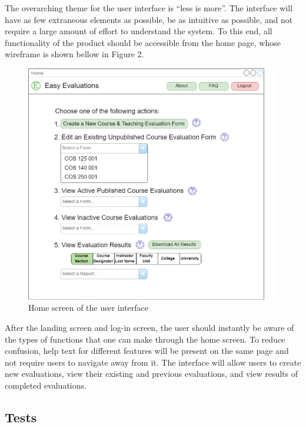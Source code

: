\documentclass{article}
\begin{document}
The overarching theme for the user interface is ``less is more''.  The interface will have as few extraneous elements as possible, be as intuitive as possible, and not require a large amount of effort to understand the system.  To this end, all functionality of the product should be accessible from the home page, whose wireframe is shown bellow in Figure 2. 

\begin{center}
\begin{figure}[H]
    \centering
    \includegraphics[width=5.5in]{images/home_screen.png}
    \caption{Home screen of the user interface}
\end{figure}
\end{center}

After the landing screen and log-in screen, the user should instantly be aware of the types of functions that one can make through the home screen. To reduce confusion, help text for different features will be present on the same page and not require users to navigate away from it.  The interface will allow users to create new evaluations, view their existing and previous evaluations, and view results of completed evaluations.

\subsection{Tests}
\end{document}

